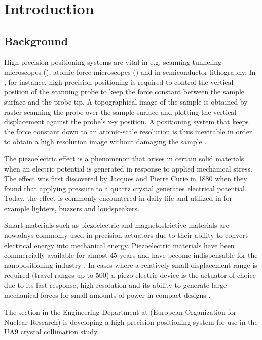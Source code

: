 \chapter{Introduction}\label{cha:intro}

\section{Background}
High precision positioning systems are vital in e.g. scanning tunneling microscopes (\abbrSTM), atomic force microscopes (\abbrAFM) and in semiconductor lithography. In \abbrAFM, for instance, high precision positioning is required to control the vertical position of the scanning probe to keep the force constant between the sample surface and the probe tip. A topographical image of the sample is obtained by raster-scanning the probe over the sample surface and plotting the vertical displacement against the probe's x-y position. A positioning system that keeps the force constant down to an atomic-scale resolution is thus inevitable in order to obtain a high resolution image without damaging the sample \citep{SurveyOfControlIssues:2007}.

The piezoelectric effect is a phenomenon that arises in certain solid materials when an electric potential is generated in response to applied mechanical stress. The effect was first discovered by Jacques and Pierre Curie in 1880 when they found that applying pressure to a quartz crystal generates electrical potential. Today, the effect is commonly encountered in daily life and utilized in for example lighters, buzzers and loudspeakers.

Smart materials such as piezoelectric and magnetostrictive materials are nowadays commonly used in precision actuators due to their ability to convert electrical energy into mechanical energy. Piezoelectric materials have been commercially available for almost 45 years and have become indispensable for the nanopositioning industry \citep{Piezo:2008}. In cases where a relatively small displacement range is required (travel ranges up to \unit{500}{\micro\meter}) a piezo electric device is the actuator of choice due to its fast response, high resolution and its ability to generate large mechanical forces for small amounts of power in compact designs \citep{SurveyOfControlIssues:2007}.

The \abbrENSTIECE section in the Engineering Department at \abbrCERN (European Organization for Nuclear Research) is developing a high precision positioning system for use in the UA9 crystal collimation study.

